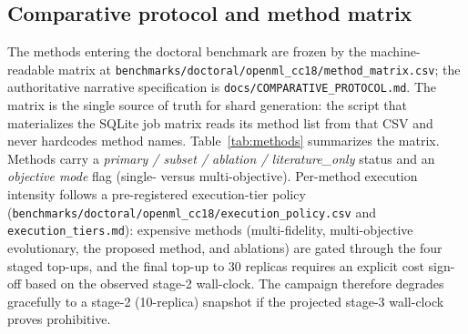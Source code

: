 \subsection{Comparative protocol and method matrix}
\label{sec:exp-protocol}
The methods entering the doctoral benchmark are frozen by the
machine-readable matrix at
\texttt{benchmarks/doctoral/openml\_cc18/method\_matrix.csv}; the
authoritative narrative specification is
\texttt{docs/COMPARATIVE\_PROTOCOL.md}. The matrix is the single
source of truth for shard generation: the script that materializes
the SQLite job matrix reads its method list from that CSV and never
hardcodes method names. Table~\ref{tab:methods} summarizes the
matrix. Methods carry a \emph{primary / subset / ablation /
literature\_only} status and an \emph{objective mode} flag (single-
versus multi-objective).
Per-method execution intensity follows a pre-registered
execution-tier policy
(\texttt{benchmarks/doctoral/openml\_cc18/execution\_policy.csv} and
\texttt{execution\_tiers.md}): expensive methods (multi-fidelity,
multi-objective evolutionary, the proposed method, and ablations)
are gated through the four staged top-ups, and the final
top-up to 30 replicas requires an explicit cost sign-off based on
the observed stage-2 wall-clock. The campaign therefore degrades
gracefully to a stage-2 (10-replica) snapshot if the projected
stage-3 wall-clock proves prohibitive.

